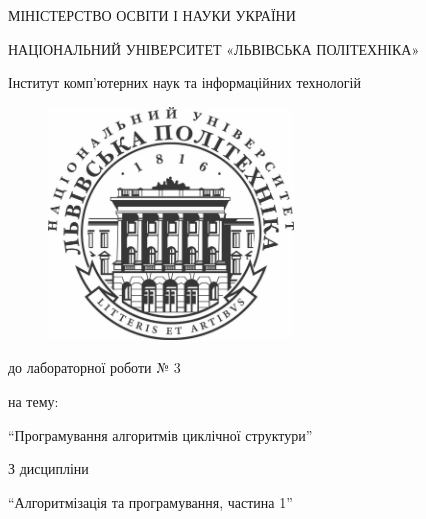 \documentclass{article}
\begin{document}
\pagestyle{empty}
\begin{center}

	{\fontsize{14}{24}\selectfont МІНІСТЕРСТВО ОСВІТИ І НАУКИ УКРАЇНИ

	НАЦІОНАЛЬНИЙ УНІВЕРСИТЕТ «ЛЬВІВСЬКА ПОЛІТЕХНІКА»

	Інститут комп'ютерних наук та інформаційних технологій

	}

	\vspace{90.4pt} %
	\begin{figure}[h]
		\centering
		\includegraphics[width=6.5cm,keepaspectratio]{../../../lpnu.png}
	\end{figure}

	{\fontsize{18}{29}\selectfont{Звіт}

	{до лабораторної роботи № 3}

	{на тему:}

	{``Програмування алгоритмів циклічної структури''}

	{З дисципліни}

	{``Алгоритмізація та програмування, частина 1''}

	}
\end{center}
\end{document}
